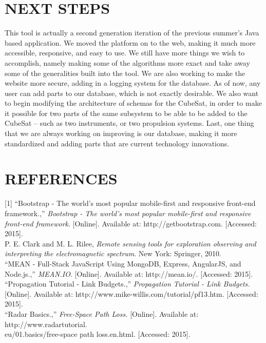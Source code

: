 \documentclass[a4, 12 pt]{article} %
\begin{document}
\section{NEXT STEPS}
This tool is actually a second generation iteration of the previous summer's Java based application. We moved the platform on to the web, making it much more accessible, responsive, and easy to use. We still have more things we wish to accomplish, namely making some of the algorithms more exact and take away some of the generalities built into the tool. We are also working to make the website more secure, adding in a logging system for the database. As of now, any user can add parts to our database, which is not exactly desirable. We also want to begin modifying the architecture of schemas for the CubeSat, in order to make it possible for two parts of the same subsystem to be able to be added to the CubeSat -- such as two instruments, or two propulsion systems. Last, one thing that we are always working on improving is our database, making it more standardized and adding parts that are current technology innovations.
\newpage
\section{REFERENCES}
[1] ``Bootstrap - The world's most popular mobile-first and responsive front-end framework.,'' \textit{Bootstrap - The world's most popular mobile-first and responsive front-end framework}. [Online]. Available at: http://getbootstrap.com. [Accessed: 2015].\\[2mm]

\noindent [2] P. E. Clark and M. L. Rilee, \textit{Remote sensing tools for exploration observing and interpreting the electromagnetic spectrum}. New York: Springer, 2010.\\[2mm]

\noindent [3] ``MEAN - Full-Stack JavaScript Using MongoDB, Express, AngularJS, and Node.js.,'' \textit{MEAN.IO}. [Online]. Available at: http://mean.io/. [Accessed: 2015].\\[2mm]

\noindent [4] ``Propagation Tutorial - Link Budgets.,'' \textit{Propagation Tutorial - Link Budgets.} [Online]. Available at: http://www.mike-willis.com/tutorial/pf13.htm. [Accessed: 2015].\\[2mm]

\noindent [5] ``Radar Basics.,'' \textit{Free-Space Path Loss.} [Online]. Available at: http://www.radartutorial.\\eu/01.basics/free-space path loss.en.html. [Accessed: 2015].\\[2mm]
\end{document}
